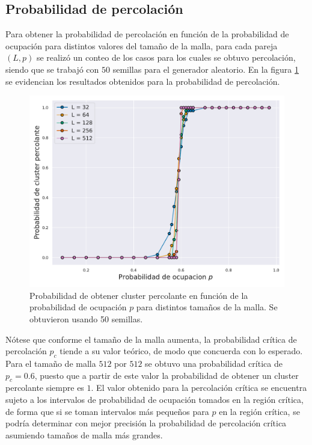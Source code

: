 \documentclass[%
 reprint,
 amsmath,amssymb,
 aps,
]{revtex4-2}
\begin{document}
\subsection{Probabilidad de percolación}

Para obtener la probabilidad de percolación en función de la probabilidad de ocupación para distintos valores del tamaño de la malla, para cada pareja $(L, p)$ se realizó un conteo de los casos para los cuales se obtuvo percolación, siendo que se trabajó con $50$ semillas para el generador aleatorio. En la figura \ref{fig: probabilidad} se evidencian los resultados obtenidos para la probabilidad de percolación.

\begin{figure}[H]
    \centering
    \includegraphics[width=1\linewidth]{Probabilidadcluster.pdf}
    \caption{Probabilidad de obtener cluster percolante en función de la probabilidad de ocupación $p$ para distintos tamaños de la malla. Se obtuvieron usando 50 semillas.}
    \label{fig: probabilidad}
\end{figure}

Nótese que conforme el tamaño de la malla aumenta, la probabilidad crítica de percolación $p_c$ tiende a su valor teórico, de modo que concuerda con lo esperado. Para el tamaño de malla $512$ por $512$ se obtuvo una probabilidad crítica de $p_c = 0.6$, puesto que a partir de este valor la probabilidad de obtener un cluster percolante siempre es $1$. El valor obtenido para la percolación crítica se encuentra sujeto a los intervalos de probabilidad de ocupación tomados en la región crítica, de forma que si se toman intervalos más pequeños para $p$ en la región crítica, se podría determinar con mejor precisión la probabilidad de percolación crítica asumiendo tamaños de malla más grandes.
\end{document}
